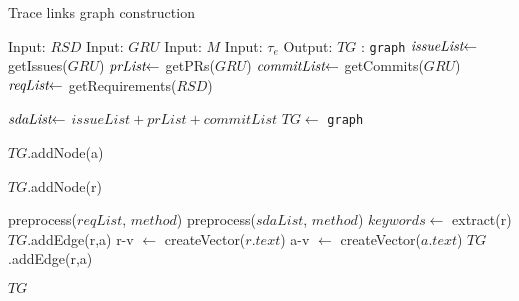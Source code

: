 \setphaserulewidth{0.4pt}

\begin{breakablealgorithm}
\caption{Trace links graph construction}
\label{alg:process-software-artifacts}
\begin{algorithmic}[1]
\State Input: $RSD$ 
\State Input: $GRU$  
\State Input: $M$  
\State Input: $\tau_{e}$  
\State Output: $TG$ : \texttt{graph} 
\State $\textit{issueList} \hspace{-0.1cm} \leftarrow$  \hspace{-0.2cm} getIssues($GRU$)\label{algl:m}
\State $\textit{prList} \hspace{-0.1cm} \leftarrow$  \hspace{-0.2cm} getPRs($GRU$)\label{algl:m}
\State $\textit{commitList} \hspace{-0.1cm} \leftarrow$  \hspace{-0.2cm} getCommits($GRU$)\label{algl:m}
\State $\textit{reqList} \hspace{-0.1cm} \leftarrow$  \hspace{-0.2cm} getRequirements($RSD$)\label{algl:m}



\State $\textit{sdaList} \hspace{-0.1cm} \leftarrow$  \hspace{-0.2cm} $issueList+prList+commitList$\label{algl:m}
\State $TG \leftarrow$  \texttt{graph} 

 \label{algl:c}
\State $TG$.addNode(a)
\EndFor \label{algl:c}

 \label{algl:c}
\State $TG$.addNode(r)
\EndFor \label{algl:c}


\State preprocess($reqList$, $method$)
\State preprocess($sdaList$, $method$)
\State $keywords \leftarrow$ extract(r)
\State $TG$.addEdge(r,a)
\EndIf
\EndIf
{}
\State r-v $\leftarrow$ createVector($r.text$)
\State a-v $\leftarrow$ createVector($a.text$)
\State $TG$.addEdge(r,a)
\EndIf
\EndIf
\EndFor
\EndFor

\Return $TG$
\end{algorithmic}

\end{breakablealgorithm}


